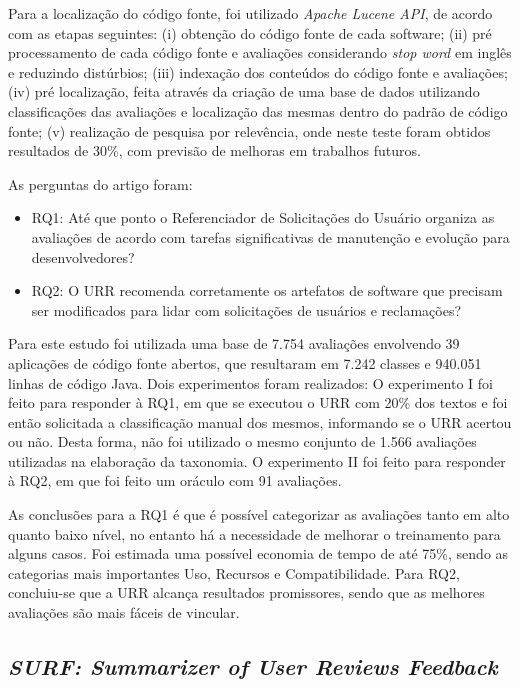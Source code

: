 Para a localização do código fonte, foi utilizado \textit{Apache Lucene API}, de acordo com as etapas seguintes: (i) obtenção do código fonte de cada software; (ii) pré processamento de cada código fonte e avaliações considerando \textit{stop word} em inglês e reduzindo distúrbios; (iii) indexação dos conteúdos do código fonte e avaliações; (iv) pré localização, feita através da criação de uma base de dados utilizando classificações das avaliações e localização das mesmas dentro do padrão de código fonte; (v) realização de pesquisa por relevência, onde neste teste foram obtidos resultados de 30\%, com previsão de melhoras em trabalhos futuros.

As perguntas do artigo foram:
\begin{itemize}
\item RQ1: Até que ponto o Referenciador de Solicitações do Usuário organiza as avaliações de acordo com tarefas significativas de manutenção e evolução para desenvolvedores?

\item RQ2: O URR recomenda corretamente os artefatos de software que precisam ser modificados para lidar com solicitações de usuários e reclamações?
\end{itemize}

Para este estudo foi utilizada uma base de 7.754 avaliações envolvendo 39 aplicações de código fonte abertos, que resultaram em 7.242 classes e 940.051 linhas de código Java.
Dois experimentos foram realizados:
O experimento I foi feito para responder à RQ1, em que se executou o URR com 20\% dos textos e foi então solicitada a classificação manual dos mesmos, informando se o URR acertou ou não. Desta forma, não foi utilizado o mesmo conjunto de 1.566 avaliações utilizadas na elaboração da taxonomia.
O experimento II foi feito para responder à RQ2, em que foi feito um oráculo com 91 avaliações.

As conclusões para a RQ1 é que é possível categorizar as avaliações tanto em alto quanto baixo nível, no entanto há a necessidade de melhorar o treinamento para alguns casos. Foi estimada uma possível economia de tempo de até 75\%, sendo as categorias mais importantes Uso, Recursos e Compatibilidade.
Para RQ2, concluiu-se que a URR alcança resultados promissores, sendo que as melhores avaliações são mais fáceis de vincular.

\subsection{\textit{SURF: Summarizer of User Reviews Feedback}}

